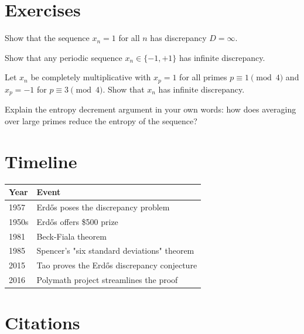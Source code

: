 \section{Exercises}

\begin{exercise}[Basic]
Show that the sequence $x_n = 1$ for all $n$ has discrepancy $D = \infty$.
\end{exercise}

\begin{exercise}[Basic]
Show that any periodic sequence $x_n \in \{-1, +1\}$ has infinite discrepancy.
\end{exercise}

\begin{exercise}[Intermediate]
Let $x_n$ be completely multiplicative with $x_p = 1$ for all primes $p \equiv 1 \pmod{4}$ and $x_p = -1$ for $p \equiv 3 \pmod{4}$. Show that $x_n$ has infinite discrepancy.
\end{exercise}

\begin{exercise}[Challenge]
Explain the entropy decrement argument in your own words: how does averaging over large primes reduce the entropy of the sequence?
\end{exercise}

\section{Timeline}

\begin{tabularx}{\linewidth}{lX}
\toprule
\textbf{Year} & \textbf{Event} \\ \midrule
1957 & Erdős poses the discrepancy problem \\ 
1950s & Erdős offers \$500 prize \\ 
1981 & Beck-Fiala theorem \\ 
1985 & Spencer's "six standard deviations" theorem \\ 
2015 & Tao proves the Erdős discrepancy conjecture \\ 
2016 & Polymath project streamlines the proof \\ \bottomrule
\end{tabularx}

\section{Citations}

